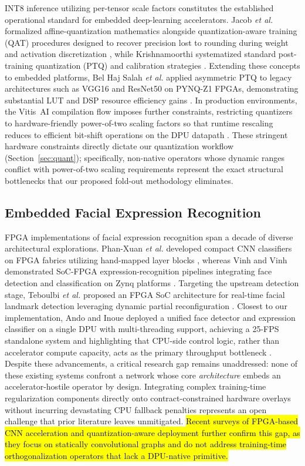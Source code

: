\documentclass[algorithms,article,submit,moreauthors]{Definitions/mdpi}
\newcommand{\rev}[1]{\hl{#1}}
\begin{document}
INT8 inference utilizing per-tensor scale factors constitutes the established operational standard for embedded deep-learning accelerators. Jacob \textit{et al.} formalized affine-quantization mathematics alongside quantization-aware training (QAT) procedures designed to recover precision lost to rounding during weight and activation discretization \citep{bib9}, while Krishnamoorthi systematized standard post-training quantization (PTQ) and calibration strategies \citep{bib10}. Extending these concepts to embedded platforms, Bel Haj Salah \textit{et al.} applied asymmetric PTQ to legacy architectures such as VGG16 and ResNet50 on PYNQ-Z1 FPGAs, demonstrating substantial LUT and DSP resource efficiency gains \citep{bib11}. In production environments, the Vitis~AI compilation flow imposes further constraints, restricting quantizers to hardware-friendly power-of-two scaling factors so that runtime rescaling reduces to efficient bit-shift operations on the DPU datapath \citep{bib1}. These stringent hardware constraints directly dictate our quantization workflow (Section~\ref{sec:quant}); specifically, non-native operators whose dynamic ranges conflict with power-of-two scaling requirements represent the exact structural bottlenecks that our proposed fold-out methodology eliminates.

\subsection{Embedded Facial Expression Recognition}

FPGA implementations of facial expression recognition span a decade of diverse architectural explorations. Phan-Xuan \textit{et al.} developed compact CNN classifiers on FPGA fabrics utilizing hand-mapped layer blocks \citep{bib12}, whereas Vinh and Vinh demonstrated SoC-FPGA expression-recognition pipelines integrating face detection and classification on Zynq platforms \citep{bib13}. Targeting the upstream detection stage, Teboulbi \textit{et al.} proposed an FPGA SoC architecture for real-time facial landmark detection leveraging dynamic partial reconfiguration \citep{bib14}. Closest to our implementation, Ando and Inoue deployed a unified face detector and expression classifier on a single DPU with multi-threading support, achieving a 25-FPS standalone system and highlighting that CPU-side control logic, rather than accelerator compute capacity, acts as the primary throughput bottleneck \citep{bib15}. Despite these advancements, a critical research gap remains unaddressed: none of these existing systems confront a network whose core \emph{architecture} embeds an accelerator-hostile operator by design. Integrating complex training-time regularization components directly onto contract-constrained hardware overlays without incurring devastating CPU fallback penalties represents an open challenge that prior literature leaves unmitigated. \rev{Recent surveys of FPGA-based CNN acceleration and quantization-aware deployment further confirm this gap, as they focus on statically convolutional graphs and do not address training-time orthogonalization operators that lack a DPU-native primitive.}
\end{document}
